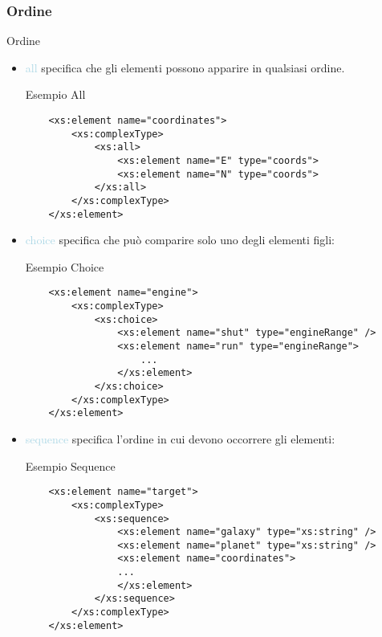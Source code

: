 \documentclass{beamer}
\begin{document}
	\subsubsection{Ordine}
	\begin{frame}[containsverbatim]{Ordine}
	\begin{itemize}
	\item \textcolor{lightblue}{all} specifica che gli elementi possono apparire in qualsiasi ordine.
	\begin{block}{Esempio All}
	\begin{lstlisting}
	<xs:element name="coordinates">
		<xs:complexType>
			<xs:all>
				<xs:element name="E" type="coords">
				<xs:element name="N" type="coords">
			</xs:all>
		</xs:complexType>
	</xs:element>
	\end{lstlisting}
	\end{block}	
	\end{itemize}
	\end{frame}
	\begin{frame}[containsverbatim]
	\begin{itemize}
	\item \textcolor{lightblue}{choice} specifica che può comparire solo uno degli elementi figli:
	\begin{block}{Esempio Choice}
	\begin{lstlisting}
	<xs:element name="engine">
		<xs:complexType>
			<xs:choice>
				<xs:element name="shut" type="engineRange" />
				<xs:element name="run" type="engineRange">
					...
				</xs:element>				
			</xs:choice>
		</xs:complexType>
	</xs:element>
	\end{lstlisting}
	\end{block}	
	\end{itemize}
	\end{frame}
	\begin{frame}[containsverbatim]
	\begin{itemize}
	\item \textcolor{lightblue}{sequence} specifica l'ordine in cui devono occorrere gli elementi:
	\begin{block}{Esempio Sequence}
	\begin{lstlisting}
	<xs:element name="target">
		<xs:complexType>
			<xs:sequence>
				<xs:element name="galaxy" type="xs:string" />
				<xs:element name="planet" type="xs:string" />
				<xs:element name="coordinates">
				...
				</xs:element>
			</xs:sequence>
		</xs:complexType>
	</xs:element>
	\end{lstlisting}
	\end{block}	
	\end{itemize}
	\end{frame}
	
\end{document}
